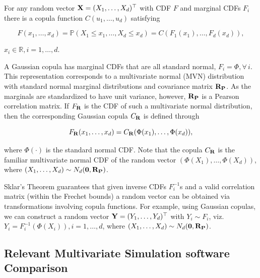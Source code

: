 \documentclass[
]{jss}
\begin{document}
For any random vector \({\bf X}=(X_1, \ldots, X_d)^\top\) with CDF \(F\)
and marginal CDFs \(F_i\) there is a copula function
\(C(u_1, \ldots, u_d)\) satisfying

\begin{equation}
F(x_1, \ldots, x_d) = {\mathbb P}(X_1\leq x_1, \ldots,X_d\leq x_d) = C(F_1(x_1), \ldots, F_d(x_d)), 
\label{eq:copula}
\end{equation}

\(x_i \in {\mathbb R}, i=1,\ldots,d.\)

A Gaussian copula has marginal CDFs that are all standard normal,
\(F_i = \Phi, \forall \, i\). This representation corresponds to a
multivariate normal (MVN) distribution with standard normal marginal
distributions and covariance matrix \({\bf R_P}\). As the marginals are
standardized to have unit variance, however, \({\bf R_P}\) is a Pearson
correlation matrix. If \(F_{{\bf R}}\) is the CDF of such a multivariate
normal distribution, then the corresponding Gaussian copula
\(C_{{\bf R}}\) is defined through

\begin{equation}
\label{eq:gauss}
F_{{\bf R}}(x_1, \ldots, x_d) = C_{{\bf R}}(\Phi(x_1), \ldots, \Phi(x_d)),
\end{equation}

where \(\Phi(\cdot)\) is the standard normal CDF. Note that the copula
\(C_{{\bf R}}\) is the familiar multivariate normal CDF of the random
vector \((\Phi(X_1), \ldots, \Phi(X_d))\), where
\((X_1, \ldots, X_d) \sim N_d({\bf 0}, {\bf R_P})\).

Sklar's Theorem \citep{Sklar1959, Ubeda-Flores2017} guarantees that
given inverse CDFs \(F_i^{-1}\)s and a valid correlation matrix (within
the Frechet bounds) a random vector can be obtained via transformations
involving copula functions. For example, using Gaussian copulas, we can
construct a random vector \({\bf Y} = (Y_1, \ldots, Y_d)^\top\) with
\(Y_i \sim F_i\), viz.~\(Y_i = F_i^{-1}(\Phi(X_i)), i=1, \ldots, d\),
where \((X_1, \ldots, X_d) \sim N_d({\bf 0}, {\bf R_P})\).

\hypertarget{relevant-multivariate-simulation-software-comparison}{%
\subsection{Relevant Multivariate Simulation software
Comparison}\label{relevant-multivariate-simulation-software-comparison}}
\end{document}
